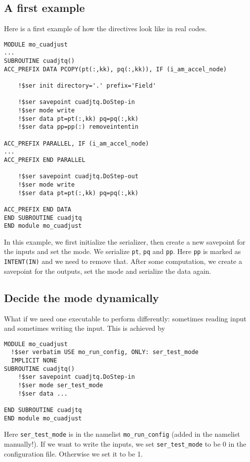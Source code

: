 \documentclass{article}
\begin{document}
\subsection{A first example}
\label{ex:first}
Here is a first example of how the directives look like in real codes.
\begin{lstlisting}
MODULE mo_cuadjust
...
SUBROUTINE cuadjtq()
ACC_PREFIX DATA PCOPY(pt(:,kk), pq(:,kk)), IF (i_am_accel_node) 

    !$ser init directory='.' prefix='Field'

    !$ser savepoint cuadjtq.DoStep-in
    !$ser mode write
    !$ser data pt=pt(:,kk) pq=pq(:,kk)
    !$ser data pp=pp(:) removeintentin

ACC_PREFIX PARALLEL, IF (i_am_accel_node) 
...
ACC_PREFIX END PARALLEL

    !$ser savepoint cuadjtq.DoStep-out
    !$ser mode write
    !$ser data pt=pt(:,kk) pq=pq(:,kk)

ACC_PREFIX END DATA
END SUBROUTINE cuadjtq
END module mo_cuadjust
\end{lstlisting}

In this example, we first initialize the serializer, then create a new savepoint for the inputs and set the mode. We serialize \texttt{pt}, \texttt{pq} and \texttt{pp}. Here \texttt{pp} is marked as \texttt{INTENT(IN)} and we need to remove that. After some computation, we create a savepoint for the outputs, set the mode and serialize the data again.

\subsection{Decide the mode dynamically}
\label{ex:mode}
What if we need one executable to perform differently: sometimes reading input and sometimes writing the input. This is achieved by
\begin{lstlisting}
MODULE mo_cuadjust
  !$ser verbatim USE mo_run_config, ONLY: ser_test_mode
  IMPLICIT NONE
SUBROUTINE cuadjtq()
    !$ser savepoint cuadjtq.DoStep-in
    !$ser mode ser_test_mode
    !$ser data ...

END SUBROUTINE cuadjtq
END module mo_cuadjust
\end{lstlisting}

Here \texttt{ser\_test\_mode} is in the namelist \texttt{mo\_run\_config} (added in the namelist manually!). If we want to write the inputs, we set \texttt{ser\_test\_mode} to be 0 in the configuration file. Otherwise we set it to be 1.
\end{document}
